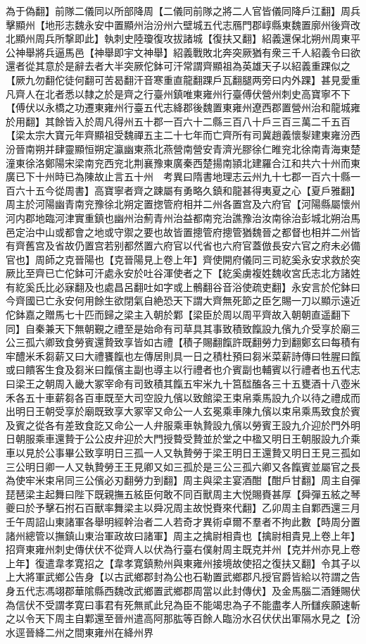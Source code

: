 為于偽翻】前隊二儀同以所部降周【二儀同前隊之將二人官皆儀同降戶江翻】周兵擊顯州【地形志魏永安中置顯州治汾州六壁城五代志鴈門郡崞縣東魏置廓州後齊改北顯州周兵所撃即此】執刺史陸瓊復攻拔諸城【復扶又翻】紹義還保北朔州周東平公神舉將兵逼馬邑【神舉即宇文神舉】紹義戰敗北奔突厥猶有衆三千人紹義令曰欲還者從其意於是辭去者大半突厥佗鉢可汗常謂齊顯祖為英雄天子以紹義重踝似之【厥九勿翻佗徒何翻可苦曷翻汗音寒重直龍翻踝戶瓦翻腿两旁曰内外踝】甚見愛重凡齊人在北者悉以隸之於是齊之行臺州鎮唯東雍州行臺傅伏營州刺史高寶寧不下【傅伏以永橋之功遷東雍州行臺五代志絳郡後魏置東雍州遼西郡置營州治和龍城雍於用翻】其餘皆入於周凡得州五十郡一百六十二縣三百八十戶三百三萬二千五百【梁太宗大寶元年齊顯祖受魏禪五主二十七年而亡齊所有司冀趙義懷㴝建東雍汾西汾晉南朔并肆靈顯恒朔定瀛幽東燕北燕營南營安青濟光膠徐仁睢兖北徐南青海東楚潼東徐洛鄭陽宋梁南兖西兖北荆襄豫東廣秦西楚揚南頴北建羅合江和共六十州而東廣已下十州時已為陳故止言五十州　考異曰隋書地理志云州九十七郡一百六十縣一百六十五今從周書】高寶寧者齊之踈屬有勇略久鎮和龍甚得夷夏之心【夏戶雅翻】周主於河陽幽青南兖豫徐北朔定置揔管府相并二州各置宫及六府官【河陽縣屬懷州河内郡地臨河津實重鎮也幽州治薊青州治益都南兖治譙豫治汝南徐治彭城北朔治馬邑定治中山或都會之地或守禦之要也故皆置摠管府摠管猶魏晉之都督也相并二州皆有齊舊宫及省故仍置宫若别都然置六府官以代省也六府官蓋倣長安六官之府未必備官也】周師之克晉陽也【克晉陽見上卷上年】齊使開府儀同三司紇奚永安求救於突厥比至齊已亡佗鉢可汗處永安於吐谷渾使者之下【紇奚虜複姓魏收宮氏志北方諸姓有紇奚氏比必寐翻及也處昌呂翻吐如字或上鶻翻谷音浴使疏吏翻】永安言於佗鉢曰今齊國已亡永安何用餘生欲閉氣自絶恐天下謂大齊無死節之臣乞賜一刀以顯示遠近佗鉢嘉之贈馬七十匹而歸之梁主入朝於鄴【梁臣於周以周平齊故入朝朝直遥翻下同】自秦兼天下無朝覲之禮至是始命有司草具其事致積致餼設九儐九介受享於廟三公三孤六卿致食勞賓還贄致享皆如古禮【積子賜翻餼許既翻勞力到翻鄭玄曰每積有牢醴米禾芻薪又曰大禮饔餼也左傳居則具一日之積杜預曰芻米菜薪詩傳曰牲腥曰餼或曰饋客生食及芻米曰餼儐主副也導主以行禮者也介賓副也輔賓以行禮者也五代志曰梁王之朝周入畿大冢宰命有司致積其餼五牢米九十筥䤈醢各三十五甕酒十八壺米禾各五十車薪芻各百車既至大司空設九儐以致館梁王束帛乘馬設九介以待之禮成而出明日王朝受享於廟既致享大冢宰又命公一人玄冕乘車陳九儐以束帛乘馬致食於賓及賓之從各有差致食訖又命公一人弁服乘車執贄設九儐以勞賓王設九介迎於門外明日朝服乘車還贄于公公皮弁迎於大門授䞇受贄並於堂之中楹又明日王朝服設九介乘車以見於公事畢公致享明日三孤一人又執贄勞于梁王明日王還贄又明日王見三孤如三公明日卿一人又執贄勞王王見卿又如三孤於是三公三孤六卿又各餼賓並屬官之長為使牢米束帛同三公儐必刃翻勞力到翻】周主與梁主宴酒酣【酣戶甘翻】周主自彈琵琶梁主起舞曰陛下既親撫五絃臣何敢不同百獸周主大悦賜賚甚厚【舜彈五絃之琴夔曰於予擊石拊石百獸率舞梁主以舜况周主故悦賚來代翻】乙卯周主自鄴西還三月壬午周詔山東諸軍各舉明經幹治者二人若奇才異術卓爾不羣者不拘此數【時周分置諸州總管以撫鎮山東治軍政故曰諸軍】周主之擒尉相貴也【擒尉相貴見上卷上年】招齊東雍州刺史傳伏伏不從齊人以伏為行臺右僕射周主既克并州【克并州亦見上卷上年】復遣韋孝寛招之【韋孝寛鎮勲州與東雍州接境故使招之復扶又翻】令其子以上大將軍武鄉公告身【以古武鄉郡封為公也石勒置武鄉郡凡授官爵皆給以符謂之告身五代志馮翊郡華隂縣西魏改武鄉置武鄉郡周當以此封傳伏】及金馬腦二酒鍾賜伏為信伏不受謂孝寛曰事君有死無貳此兒為臣不能竭忠為子不能盡孝人所讎疾願速斬之以令天下周主自鄴還至晉州遣高阿那肱等百餘人臨汾水召伏伏出軍隔水見之【汾水逕晉絳二州之間東雍州在絳州界